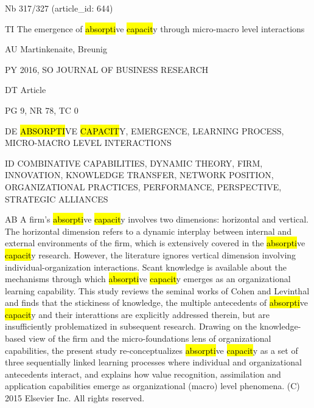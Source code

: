 \documentclass[a4paper]{article}
\begin{document}
\vspace*{-2cm}
Nb \tabto{0cm}317/327 (article\_id: 644)\par
TI \tabto{0cm}The emergence of \hl{absorpti}ve \hl{capacit}y through micro-macro level interactions\par
AU \tabto{0cm}Martinkenaite, Breunig\par
PY \tabto{0cm}2016, SO JOURNAL OF BUSINESS RESEARCH\par
DT \tabto{0cm}Article\par
PG \tabto{0cm}9, NR 78, TC 0\par
DE \tabto{0cm}\hl{ABSORPTI}VE \hl{CAPACIT}Y, EMERGENCE, LEARNING PROCESS, MICRO-MACRO LEVEL INTERACTIONS\par
ID \tabto{0cm}COMBINATIVE CAPABILITIES, DYNAMIC THEORY, FIRM, INNOVATION, KNOWLEDGE TRANSFER, NETWORK POSITION, ORGANIZATIONAL PRACTICES, PERFORMANCE, PERSPECTIVE, STRATEGIC ALLIANCES\par
AB \tabto{0cm}A firm's \hl{absorpti}ve \hl{capacit}y involves two dimensions: horizontal and vertical. The horizontal dimension refers to a dynamic interplay between internal and external environments of the firm, which is extensively covered in the \hl{absorpti}ve \hl{capacit}y research. However, the literature ignores vertical dimension involving individual-organization interactions. Scant knowledge is available about the mechanisms through which \hl{absorpti}ve \hl{capacit}y emerges as an organizational learning capability. This study reviews the seminal works of Cohen and Levinthal and finds that the stickiness of knowledge, the multiple antecedents of \hl{absorpti}ve \hl{capacit}y and their interattions are explicitly addressed therein, but are insufficiently problematized in subsequent research. Drawing on the knowledge-based view of the firm and the micro-foundations lens of organizational capabilities, the present study re-conceptualizes \hl{absorpti}ve \hl{capacit}y as a set of three sequentially linked learning processes where individual and organizational antecedents interact, and explains how value recognition, assimilation and application capabilities emerge as organizational (macro) level phenomena. (C) 2015 Elsevier Inc. All rights reserved.\par
\clearpage
\end{document}
